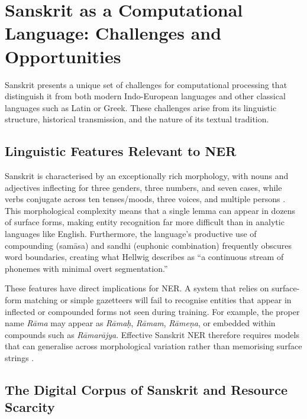 \section{Sanskrit as a Computational Language: Challenges and Opportunities}
\label{sec:sanskrit_computational}

Sanskrit presents a unique set of challenges for computational processing that distinguish it from both modern Indo-European languages and other classical languages such as Latin or Greek. These challenges arise from its linguistic structure, historical transmission, and the nature of its textual tradition.

\subsection{Linguistic Features Relevant to NER}
\label{subsec:linguistic_features}

Sanskrit is characterised by an exceptionally rich morphology, with nouns and adjectives inflecting for three genders, three numbers, and seven cases, while verbs conjugate across ten tenses/moods, three voices, and multiple persons \cite{kiparsky2009architecture}. This morphological complexity means that a single lemma can appear in dozens of surface forms, making entity recognition far more difficult than in analytic languages like English. Furthermore, the language's productive use of compounding (samāsa) and sandhi (euphonic combination) frequently obscures word boundaries, creating what Hellwig \cite{hellwig2010dcs} describes as ``a continuous stream of phonemes with minimal overt segmentation.''

These features have direct implications for NER. A system that relies on surface-form matching or simple gazetteers will fail to recognise entities that appear in inflected or compounded forms not seen during training. For example, the proper name \textit{Rāma} may appear as \textit{Rāmaḥ}, \textit{Rāmam}, \textit{Rāmeṇa}, or embedded within compounds such as \textit{Rāmarājya}. Effective Sanskrit NER therefore requires models that can generalise across morphological variation rather than memorising surface strings \cite{hellwig2018segmentation}.

\subsection{The Digital Corpus of Sanskrit and Resource Scarcity}
\label{subsec:dcs_resource}

